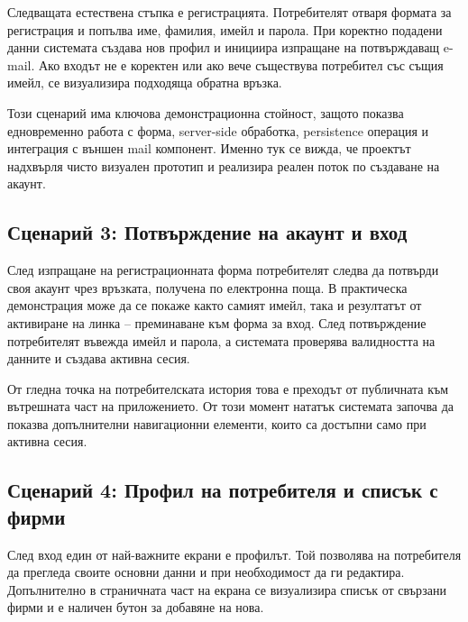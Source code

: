 Следващата естествена стъпка е регистрацията. Потребителят отваря формата за регистрация и попълва име, фамилия, имейл и парола. При коректно подадени данни системата създава нов профил и инициира изпращане на потвърждаващ e-mail. Ако входът не е коректен или ако вече съществува потребител със същия имейл, се визуализира подходяща обратна връзка.

Този сценарий има ключова демонстрационна стойност, защото показва едновременно работа с форма, server-side обработка, persistence операция и интеграция с външен mail компонент. Именно тук се вижда, че проектът надхвърля чисто визуален прототип и реализира реален поток по създаване на акаунт.


\subsection{Сценарий 3: Потвърждение на акаунт и вход}

След изпращане на регистрационната форма потребителят следва да потвърди своя акаунт чрез връзката, получена по електронна поща. В практическа демонстрация може да се покаже както самият имейл, така и резултатът от активиране на линка -- преминаване към форма за вход. След потвърждение потребителят въвежда имейл и парола, а системата проверява валидността на данните и създава активна сесия.

От гледна точка на потребителската история това е преходът от публичната към вътрешната част на приложението. От този момент нататък системата започва да показва допълнителни навигационни елементи, които са достъпни само при активна сесия.


\subsection{Сценарий 4: Профил на потребителя и списък с фирми}

След вход един от най-важните екрани е профилът. Той позволява на потребителя да прегледа своите основни данни и при необходимост да ги редактира. Допълнително в страничната част на екрана се визуализира списък от свързани фирми и е наличен бутон за добавяне на нова.


